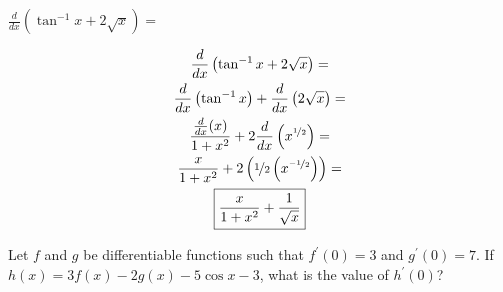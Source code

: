 \documentclass[12pt,letterpaper, onecolumn]{exam}
\begin{document}
\begin{questions}

\pagebreak

\question $\frac{d}{dx} ( \tan^{-1} x + 2 \sqrt{x} ) = $	


    \begin{solution}
          \begin{gather*}
		\frac{d}{dx} \left( \tan^{-1} x + 2 \sqrt{x} \right)  = \\ 
		\frac{d}{dx} \left( \tan^{-1} x \right) + \frac{d}{dx} \left( 2 \sqrt{x} \right) = \\
		\frac{\frac{d}{dx}(x)}{1+x^2} + 2 \frac{d}{dx} \left( x^{\nicefrac{1}{2}} \right) = \\
		\frac{x}{1+x^2} + 2 \left(\nicefrac{1}{2}\left(x^{\nicefrac{-1}{2}}\right)\right) = \\
		\boxed{\frac{x}{1+x^2} + \frac{1}{\sqrt{x}}}
	\end{gather*}
    \end{solution}
    

\pagebreak

\question Let $f$ and $g$ be differentiable functions such that $f^\prime(0)=3$ and $g^\prime (0) = 7$. If $h(x)=3f(x)-2g(x)-5\cos x -3$, what is the value of $h^\prime(0)$?


\end{questions}
\end{document}

